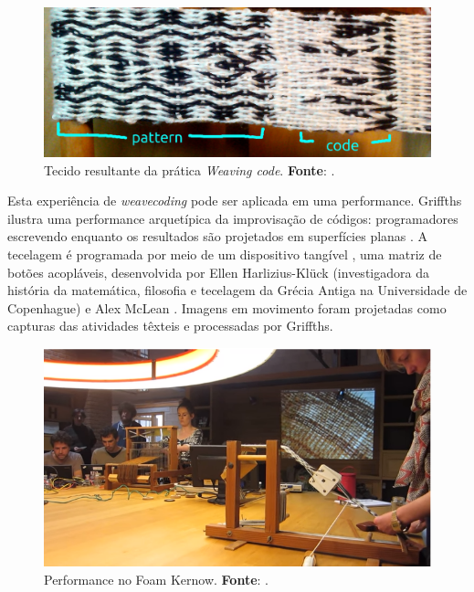 \begin{figure}[!h]
    \centering
    \includegraphics[scale=0.31]{imagens/weaving.jpg}
    \caption{Tecido resultante da prática \emph{Weaving code}. \textbf{Fonte}: .}
  \label{fig:weaving}
\end{figure}

Esta experiência de \emph{weavecoding} pode ser aplicada em uma performance. Griffths ilustra uma performance arquetípica da improvisação de códigos: programadores escrevendo enquanto os resultados são projetados em superfícies planas . A tecelagem é programada por meio de um dispositivo tangível , uma matriz de botões acopláveis, desenvolvida por Ellen Harlizius-Klück (investigadora da história da matemática, filosofia e tecelagem da Grécia Antiga na Universidade de Copenhague) e Alex McLean . Imagens em movimento foram projetadas como capturas das atividades têxteis e processadas por Griffths. 

\begin{figure}[h]
  \centering
  \includegraphics[scale=0.65]{imagens/weaving.png}
  \caption{Performance no Foam Kernow. \textbf{Fonte}: .}
  \label{fig:weavecoding}
\end{figure}

